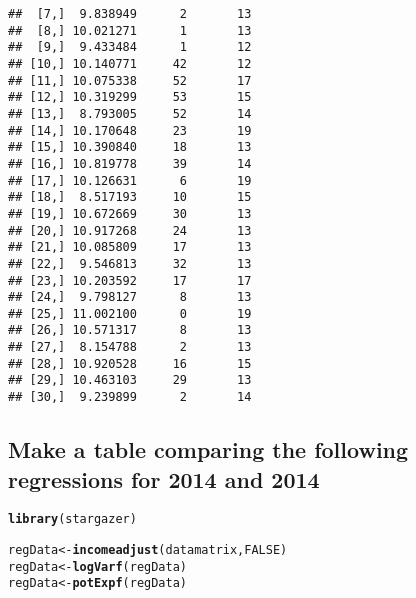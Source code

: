 \documentclass{article}\usepackage[]{graphicx}\usepackage[]{color}
\makeatletter
\newcommand{\hlnum}[1]{\textcolor[rgb]{0.686,0.059,0.569}{#1}}%
\newcommand{\hlstd}[1]{\textcolor[rgb]{0.345,0.345,0.345}{#1}}%
\newcommand{\hlkwb}[1]{\textcolor[rgb]{0.69,0.353,0.396}{#1}}%
\newcommand{\hlkwd}[1]{\textcolor[rgb]{0.737,0.353,0.396}{\textbf{#1}}}%
\newenvironment{kframe}{%
 \def\at@end@of@kframe{}%
 \ifinner\ifhmode%
  \def\at@end@of@kframe{\end{minipage}}%
  \begin{minipage}{\columnwidth}%
 \fi\fi%
 \def\FrameCommand##1{\hskip\@totalleftmargin \hskip-\fboxsep
 \colorbox{shadecolor}{##1}\hskip-\fboxsep
     \hskip-\linewidth \hskip-\@totalleftmargin \hskip\columnwidth}%
 \MakeFramed {\advance\hsize-\width
   \@totalleftmargin\z@ \linewidth\hsize
   \@setminipage}}%
 {\par\unskip\endMakeFramed%
 \at@end@of@kframe}
\newenvironment{knitrout}{}{} %
\makeatother
\begin{document}
\begin{knitrout}
\begin{kframe}
\begin{verbatim}
##  [7,]  9.838949      2       13
##  [8,] 10.021271      1       13
##  [9,]  9.433484      1       12
## [10,] 10.140771     42       12
## [11,] 10.075338     52       17
## [12,] 10.319299     53       15
## [13,]  8.793005     52       14
## [14,] 10.170648     23       19
## [15,] 10.390840     18       13
## [16,] 10.819778     39       14
## [17,] 10.126631      6       19
## [18,]  8.517193     10       15
## [19,] 10.672669     30       13
## [20,] 10.917268     24       13
## [21,] 10.085809     17       13
## [22,]  9.546813     32       13
## [23,] 10.203592     17       17
## [24,]  9.798127      8       13
## [25,] 11.002100      0       19
## [26,] 10.571317      8       13
## [27,]  8.154788      2       13
## [28,] 10.920528     16       15
## [29,] 10.463103     29       13
## [30,]  9.239899      2       14
\end{verbatim}
\end{kframe}
\end{knitrout}

\subsection{Make a table comparing the following regressions for 2014 and 2014}

\begin{knitrout}
\color{fgcolor}\begin{kframe}
\begin{alltt}
\hlkwd{library}\hlstd{(stargazer)}

\hlstd{regData} \hlkwb{<-} \hlkwd{incomeadjust}\hlstd{(datamatrix,} \hlnum{FALSE}\hlstd{)}
\hlstd{regData} \hlkwb{<-} \hlkwd{logVarf}\hlstd{(regData)}
\hlstd{regData} \hlkwb{<-} \hlkwd{potExpf}\hlstd{(regData)}
\end{alltt}
\end{kframe}
\end{knitrout}
\end{document}
